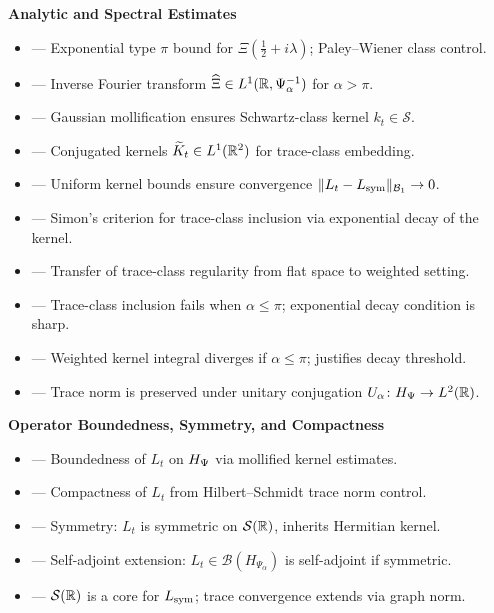 \textbf{Analytic and Spectral Estimates}
\begin{itemize}
  \item {} — Exponential type \( \pi \) bound for \( \Xi(\tfrac{1}{2} + i\lambda) \); Paley--Wiener class control.
  \item {} — Inverse Fourier transform \( \widehat{\Xi} \in L^1(\mathbb{R}, \Psi_\alpha^{-1}) \) for \( \alpha > \pi \).
  \item {} — Gaussian mollification ensures Schwartz-class kernel \( k_t \in \mathcal{S} \).
  \item {} — Conjugated kernels \( \widetilde{K}_t \in L^1(\mathbb{R}^2) \) for trace-class embedding.
  \item {} — Uniform kernel bounds ensure convergence \( \|L_t - L_{\mathrm{sym}}\|_{\mathcal{B}_1} \to 0 \).
  \item {} — Simon’s criterion for trace-class inclusion via exponential decay of the kernel.
  \item {} — Transfer of trace-class regularity from flat space to weighted setting.
  \item {} — Trace-class inclusion fails when \( \alpha \le \pi \); exponential decay condition is sharp.
  \item {} — Weighted kernel integral diverges if \( \alpha \le \pi \); justifies decay threshold.
  \item {} — Trace norm is preserved under unitary conjugation \( U_\alpha \colon H_{\Psi} \to L^2(\mathbb{R}) \).
\end{itemize}

\textbf{Operator Boundedness, Symmetry, and Compactness}
\begin{itemize}
  \item {} — Boundedness of \( L_t \) on \( H_{\Psi} \) via mollified kernel estimates.
  \item {} — Compactness of \( L_t \) from Hilbert--Schmidt trace norm control.
  \item {} — Symmetry: \( L_t \) is symmetric on \( \mathcal{S}(\mathbb{R}) \), inherits Hermitian kernel.
  \item {} — Self-adjoint extension: \( L_t \in \mathcal{B}(H_{\Psi_\alpha}) \) is self-adjoint if symmetric.
  \item {} — \( \mathcal{S}(\mathbb{R}) \) is a core for \( L_{\mathrm{sym}} \); trace convergence extends via graph norm.
\end{itemize}


